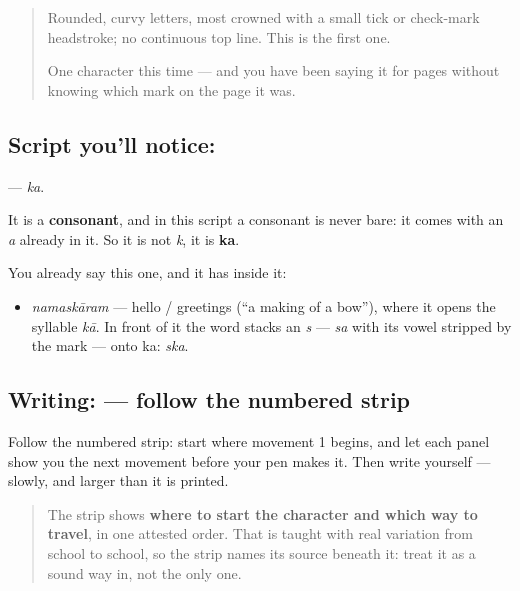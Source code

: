 \label{lesson:TE-S03-letter-ka}



\begin{quote}
Rounded, curvy letters, most crowned with a small tick or check-mark headstroke; no continuous top line. This is the first one.

One character this time — and you have been saying it for pages without knowing which mark on the page it was.
\end{quote}

\subsection*{Script you'll notice: }
\textbf{} — \emph{ka}.

It is a \textbf{consonant}, and in this script a consonant is never bare: it comes with an \emph{a} already in it. So it is not \emph{k}, it is \textbf{ka}.

You already say this one, and it has  inside it:

\begin{itemize}
\raggedright
  \item \emph{namaskāram} — hello / greetings (\textquotedblleft{}a making of a bow\textquotedblright{}), where it opens the syllable \emph{kā}. In front of it the word stacks an \emph{s} — \textbf{} \emph{sa} with its vowel stripped by the mark \textbf{} — onto ka: \textbf{} \emph{ska}.
\end{itemize}

\subsection*{Writing:  — follow the numbered strip}

Follow the numbered strip: start where movement 1 begins, and let each panel show you the next movement before your pen makes it. Then write  yourself — slowly, and larger than it is printed.

\begin{quote}
The strip shows \textbf{where to start the character and which way to travel}, in one attested order. That is taught with real variation from school to school, so the strip names its source beneath it: treat it as a sound way in, not the only one.
\end{quote}

